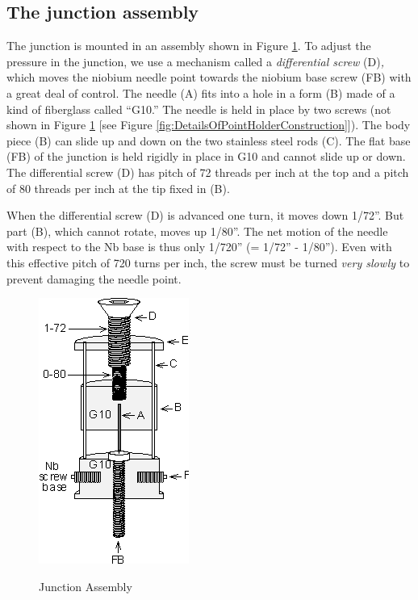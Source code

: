 \documentclass{../lab}
\begin{document}
\subsection{The junction assembly}

The junction is mounted in an assembly shown in Figure \ref{fig:JunctionAssemblyDiagram}. To adjust the pressure in the junction, we use a mechanism called a \emph{differential screw }(D)\emph{,} which moves the niobium needle point towards the niobium base screw (FB) with a great deal of control. The needle (A) fits into a hole in a form (B) made of a kind of fiberglass called ``G10.'' The needle is held in place by two screws (not shown in Figure \ref{fig:JunctionAssemblyDiagram} [see Figure \ref{fig:DetailsOfPointHolderConstruction}]). The body piece (B) can slide up and down on the two stainless steel rods (C). The flat base (FB) of the junction is held rigidly in place in G10 and cannot slide up or down. The differential screw (D) has pitch of 72 threads per inch at the top and a pitch of 80 threads per inch at the tip fixed in (B).

When the differential screw (D) is advanced one turn, it moves down 1/72''. But part (B), which cannot rotate, moves up 1/80''. The net motion of the needle with respect to the Nb base is thus only 1/720'' (= 1/72'' - 1/80''). Even with this effective pitch of 720 turns per inch, the screw must be turned \emph{very slowly} to prevent damaging the needle point.

\begin{figure}[h]
    \centering
    \href{http://experimentationlab.berkeley.edu/sites/default/files/images/JOS5.gif}{\includegraphics[width=0.4\linewidth]{images/JOS5.png}}
    \caption{Junction Assembly}
    \label{fig:JunctionAssemblyDiagram}
\end{figure}
\end{document}
